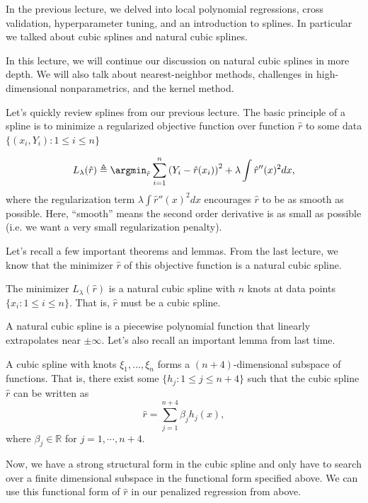 
\setcounter{section}{0}


In the previous lecture, we delved into local polynomial regressions, cross validation, hyperparameter tuning, and an introduction to splines. In particular we talked about cubic splines and natural cubic splines. 

In this lecture, we will continue our discussion on natural cubic splines in more depth. We will also talk about nearest-neighbor methods, challenges in high-dimensional nonparametrics, and the kernel method.

Let's quickly review splines from our previous lecture. The basic principle of a spline is to minimize a regularized objective function over function $\hat{r}$ to some data $\{(x_i, Y_i) : 1 \leq i \leq n\}$

\begin{equation}
    L_\lambda(\hat{r}) \triangleq \argmin_{\hat{r}} \sum_{i=1}^n \left( Y_i - \hat{r}(x_i) \right)^2 + \lambda \int \hat{r}''(x)^2dx ,
\end{equation}
where the regularization term $\lambda \int \hat{r}''(x)^2dx$ encourages $\hat{r}$ to be as smooth as possible. Here, ``smooth'' means the second order derivative is as small as possible (i.e. we want a very small regularization penalty). 

Let's recall a few important theorems and lemmas. From the last lecture, we know that the minimizer $\hat{r}$ of this objective function is a natural cubic spline.

\begin{theorem}
    The minimizer $L_\lambda(\hat{r})$ is a natural cubic spline with $n$ knots at data points $\{x_i : 1 \leq i \leq n\}$. That is, $\hat{r}$ must be a cubic spline.
\end{theorem}
A natural cubic spline is a piecewise polynomial function that linearly extrapolates near $\pm \infty$. Let's also recall an important lemma from last time.

\begin{lemma}
    A cubic spline with knots $\xi_1, ..., \xi_n$ forms a $(n + 4)$-dimensional subspace of functions. That is, there exist some $\{h_j : 1 \leq j \leq n+4\}$ such that the cubic spline $\hat{r}$ can be written as
    \begin{equation*}
        \hat{r} = \sum_{j=1}^{n+4} \beta_j h_j(x),
    \end{equation*}
    where $\beta_j \in \mathbb{R}$ for $j=1,\cdots, n+4$.
\end{lemma}
Now, we have a strong structural form in the cubic spline and only have to search over a finite dimensional subspace in the functional form specified above. We can use this functional form of $\hat{r}$ in our penalized regression from above.

